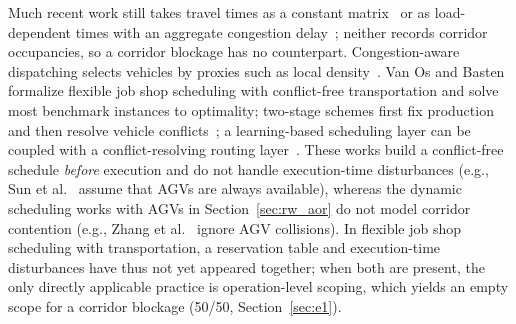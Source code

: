 \documentclass[manuscript,screen,review]{acmart}
\newcommand{\NPairs}{50}
\newcommand{\PassMiss}{\NPairs/\NPairs}      %
\begin{document}
Much recent work still takes travel times as a constant matrix~\cite{xin2025review,meng2025cp,qin2026knowledge} or as load-dependent times with an aggregate congestion delay~\cite{jafarian2026integrated}; neither records corridor occupancies, so a corridor blockage has no counterpart.
Congestion-aware dispatching selects vehicles by proxies such as local density~\cite{kim2026congestion}.
Van Os and Basten~\cite{vanos2026exact} formalize flexible job shop scheduling with conflict-free transportation and solve most benchmark instances to optimality;
two-stage schemes first fix production and then resolve vehicle conflicts~\cite{sun2023integrated}; a learning-based scheduling layer can be coupled with a conflict-resolving routing layer~\cite{li2026framework}.
These works build a conflict-free schedule \emph{before} execution and do not handle execution-time disturbances (e.g., Sun et al.~\cite{sun2023integrated} assume that AGVs are always available),
whereas the dynamic scheduling works with AGVs in Section~\ref{sec:rw_aor} do not model corridor contention (e.g., Zhang et al.~\cite{zhang2023energy} ignore AGV collisions).
In flexible job shop scheduling with transportation, a reservation table and execution-time disturbances have thus not yet appeared together;
when both are present, the only directly applicable practice is operation-level scoping, which yields an empty scope for a corridor blockage (\PassMiss, Section~\ref{sec:e1}).
\end{document}
